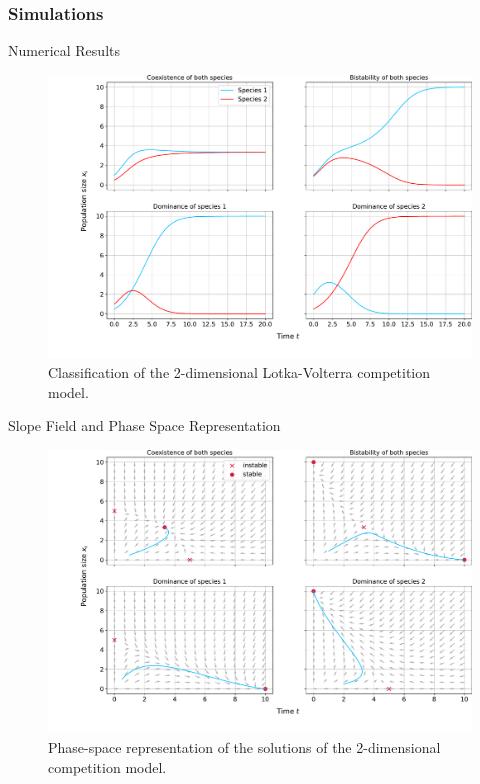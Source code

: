 \documentclass[10pt, dvipsnames]{beamer}
\begin{document}
\subsubsection{Simulations}
\begin{frame}{Numerical Results}

\begin{figure}
    \centering
    \includegraphics[width = \linewidth]{Grafiken/solution_2d_competitive_model.pdf}
    \caption{Classification of the 2-dimensional Lotka-Volterra competition model.}
    \label{fig:solution_2d_competitive_model}
\end{figure}
    
\end{frame}
\begin{frame}{Slope Field and Phase Space Representation}

\begin{figure}
    \centering
    \includegraphics[width = \linewidth]{Grafiken/phase_plots_2d_competitive_model.pdf}
    \caption{Phase-space representation of the solutions of the 2-dimensional competition model.}
    \label{fig:phase_plots_2d_competitive_model}
\end{figure}
    
\end{frame}
\end{document}
